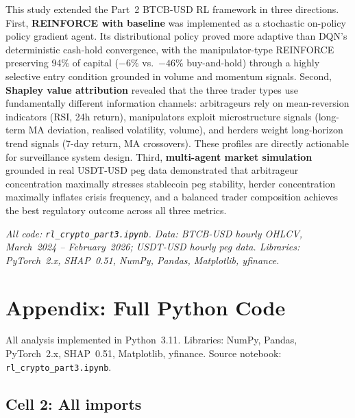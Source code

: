 \documentclass[11pt,a4paper]{article}
\begin{document}
This study extended the Part~2 BTCB-USD RL framework in three directions.  First, \textbf{REINFORCE with baseline} was implemented as a stochastic on-policy policy gradient agent.  Its distributional policy proved more adaptive than DQN's deterministic cash-hold convergence, with the manipulator-type REINFORCE preserving 94\% of capital ($-6\%$ vs.\ $-46\%$ buy-and-hold) through a highly selective entry condition grounded in volume and momentum signals.  Second, \textbf{Shapley value attribution} revealed that the three trader types use fundamentally different information channels: arbitrageurs rely on mean-reversion indicators (RSI, 24h return), manipulators exploit microstructure signals (long-term MA deviation, realised volatility, volume), and herders weight long-horizon trend signals (7-day return, MA crossovers).  These profiles are directly actionable for surveillance system design.  Third, \textbf{multi-agent market simulation} grounded in real USDT-USD peg data demonstrated that arbitrageur concentration maximally stresses stablecoin peg stability, herder concentration maximally inflates crisis frequency, and a balanced trader composition achieves the best regulatory outcome across all three metrics.

\vspace{6pt}
\noindent\small\textit{All code: \texttt{rl\_crypto\_part3.ipynb}.  Data: BTCB-USD hourly OHLCV, March~2024 -- February~2026; USDT-USD hourly peg data.  Libraries: PyTorch~2.x, SHAP~0.51, NumPy, Pandas, Matplotlib, yfinance.}

\newpage
\appendix
\section*{Appendix: Full Python Code}

All analysis implemented in Python~3.11. Libraries: NumPy, Pandas, PyTorch~2.x, SHAP~0.51, Matplotlib, yfinance.
Source notebook: \texttt{rl\_crypto\_part3.ipynb}.

\subsection*{Cell 2: All imports}
\end{document}
